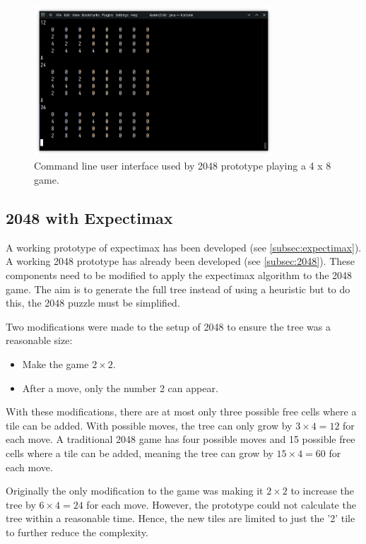 \documentclass{article}
\begin{document}
    \begin{figure}
        \centering
        \includegraphics[width=0.8\textwidth]{Screenshot_20221201_231121.png}
        \caption{Command line user interface used by 2048 prototype playing a 4 x 8 game.}
        \label{fig:2048_cli}
    \end{figure}
\subsection{2048 with Expectimax}
\label{subsec:2048_expectimax}
A working prototype of expectimax has been developed (see \ref{subsec:expectimax}). A working 2048 prototype has already been developed (see \ref{subsec:2048}).  These components need to be modified to apply the expectimax algorithm to the 2048 game. 
The aim is to generate the full tree instead of using a heuristic but to do this, the 2048 puzzle must be simplified.

Two modifications were made to the setup of 2048 to ensure the tree was a reasonable size:
\begin{itemize}
    \item Make the game $2 \times 2$.
    \item After a move, only the number 2 can appear.
\end{itemize}
With these modifications, there are at most only three possible free cells where a tile can be added. With possible moves, the tree can only grow by $3 \times 4 = 12$ for each move.
A traditional 2048 game has four possible moves and 15 possible free cells where a tile can be added, meaning the tree can grow by $15 \times 4 = 60$ for each move.

Originally the only modification to the game was making it $2 \times 2$ to increase the tree by $6 \times 4 = 24$ for each move. However, the prototype could not calculate the tree within a reasonable time. Hence, the new tiles are limited to just the '2' tile to further reduce the complexity.
\end{document}
